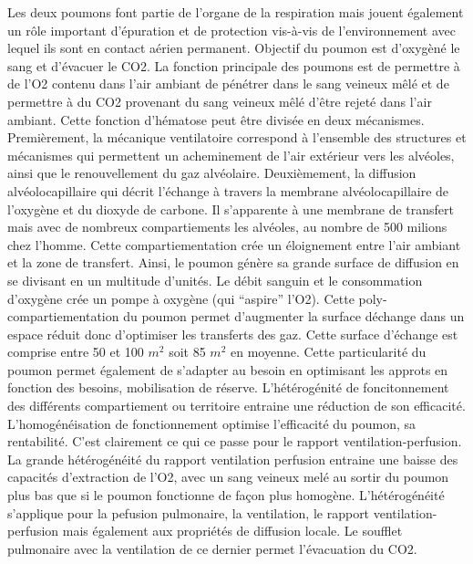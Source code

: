 \documentclass[12pt,]{article}
\begin{document}
Les deux poumons font partie de l'organe de la respiration mais jouent
également un rôle important d'épuration et de protection vis-à-vis de
l'environnement avec lequel ils sont en contact aérien permanent.
Objectif du poumon est d'oxygèné le sang et d'évacuer le CO2. La
fonction principale des poumons est de permettre à de l'O2 contenu dans
l'air ambiant de pénétrer dans le sang veineux mêlé et de permettre à du
CO2 provenant du sang veineux mêlé d'être rejeté dans l'air ambiant.
Cette fonction d'hématose peut être divisée en deux mécanismes.
Premièrement, la mécanique ventilatoire correspond à l'ensemble des
structures et mécanismes qui permettent un acheminement de l'air
extérieur vers les alvéoles, ainsi que le renouvellement du gaz
alvéolaire. Deuxièmement, la diffusion alvéolocapillaire qui décrit
l'échange à travers la membrane alvéolocapillaire de l'oxygène et du
dioxyde de carbone. Il s'apparente à une membrane de transfert mais avec
de nombreux compartiements les alvéoles, au nombre de 500 milions chez
l'homme. Cette compartiementation crée un éloignement entre l'air
ambiant et la zone de transfert. Ainsi, le poumon génère sa grande
surface de diffusion en se divisant en un multitude d'unités. Le débit
sanguin et le consommation d'oxygène crée un pompe à oxygène (qui
``aspire'' l'O2). Cette poly-compartiementation du poumon permet
d'augmenter la surface déchange dans un espace réduit donc d'optimiser
les transferts des gaz. Cette surface d'échange est comprise entre 50 et
100 \(m^{2}\) soit 85 \(m^{2}\) en moyenne. Cette particularité du
poumon permet également de s'adapter au besoin en optimisant les approts
en fonction des besoins, mobilisation de réserve. L'hétérogénité de
foncitonnement des différents compartiement ou territoire entraine une
réduction de son efficacité. L'homogénéisation de fonctionnement
optimise l'efficacité du poumon, sa rentabilité. C'est clairement ce qui
ce passe pour le rapport ventilation-perfusion. La grande hétérogénéité
du rapport ventilation perfusion entraine une baisse des capacités
d'extraction de l'O2, avec un sang veineux melé au sortir du poumon plus
bas que si le poumon fonctionne de façon plus homogène. L'hétérogénéité
s'applique pour la pefusion pulmonaire, la ventilation, le rapport
ventilation-perfusion mais également aux propriétés de diffusion locale.
Le soufflet pulmonaire avec la ventilation de ce dernier permet
l'évacuation du CO2.
\end{document}
